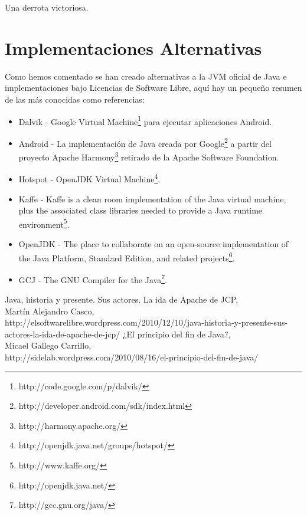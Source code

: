 \documentclass[11pt]{scrartcl}
\begin{document}
Una derrota victoriosa.

\section{Implementaciones Alternativas}

Como hemos comentado se han creado alternativas a la JVM oficial de Java e implementaciones bajo Licencias de Software Libre, aquí hay un pequeño resumen de las más conocidas como referencias:
\begin{itemize}
    \item Dalvik - Google Virtual Machine\footnote{http://code.google.com/p/dalvik/} para ejecutar aplicaciones Android.
    \item Android - La implementación de Java creada por Google\footnote{http://developer.android.com/sdk/index.html} a partir del proyecto Apache Harmony\footnote{http://harmony.apache.org/} retirado de la Apache Software Foundation.
    \item Hotspot - OpenJDK Virtual Machine\footnote{http://openjdk.java.net/groups/hotspot/}.
    \item Kaffe - Kaffe is a clean room implementation of the Java virtual machine, plus the associated class libraries needed to provide a Java runtime environment\footnote{http://www.kaffe.org/}.
    \item OpenJDK - The place to collaborate on an open-source implementation of the Java Platform, Standard Edition, and related projects\footnote{http://openjdk.java.net/}.
    \item GCJ - The GNU Compiler for the Java\footnote{http://gcc.gnu.org/java/}.
\end{itemize}

\begin{thebibliography}{9}

        Java, historia y presente. Sus actores. La ida de Apache de JCP,\\
        Martín Alejandro Casco,\\
        http://elsoftwarelibre.wordpress.com/2010/12/10/java-historia-y-presente-sus-actores-la-ida-de-apache-de-jcp/
        ¿El principio del fin de Java?,\\
        Micael Gallego Carrillo,\\
        http://sidelab.wordpress.com/2010/08/16/el-principio-del-fin-de-java/
\end{thebibliography}
\end{document}
